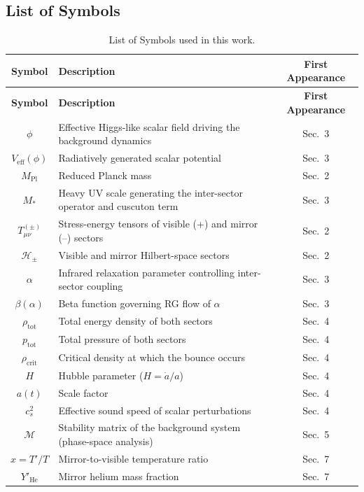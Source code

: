 \documentclass[11pt,a4paper]{article}
\begin{document}
\subsection*{List of Symbols}

\begin{longtable}{|c|p{9cm}|c|}
\caption{List of Symbols used in this work.} \label{tab:symbols} \\
\hline
\textbf{Symbol} & \textbf{Description} & \textbf{First Appearance} \\
\hline
\endfirsthead

\hline
\textbf{Symbol} & \textbf{Description} & \textbf{First Appearance} \\
\hline
\endhead

$\phi$ & Effective Higgs-like scalar field driving the background dynamics & Sec.~3 \\
$V_{\mathrm{eff}}(\phi)$ & Radiatively generated scalar potential & Sec.~3 \\
$M_{\mathrm{Pl}}$ & Reduced Planck mass & Sec.~2 \\
$M_{\ast}$ & Heavy UV scale generating the inter-sector operator and cuscuton term & Sec.~3 \\
$T^{(\pm)}_{\mu\nu}$ & Stress-energy tensors of visible (+) and mirror (–) sectors & Sec.~2 \\
$\mathcal{H}_{\pm}$ & Visible and mirror Hilbert-space sectors & Sec.~2 \\
$\alpha$ & Infrared relaxation parameter controlling inter-sector coupling & Sec.~3 \\
$\beta(\alpha)$ & Beta function governing RG flow of $\alpha$ & Sec.~3 \\
$\rho_{\mathrm{tot}}$ & Total energy density of both sectors & Sec.~4 \\
$p_{\mathrm{tot}}$ & Total pressure of both sectors & Sec.~4 \\
$\rho_{\mathrm{crit}}$ & Critical density at which the bounce occurs & Sec.~4 \\
$H$ & Hubble parameter ($H=\dot{a}/a$) & Sec.~4 \\
$a(t)$ & Scale factor & Sec.~4 \\
$c_{s}^{2}$ & Effective sound speed of scalar perturbations & Sec.~4 \\
$\mathcal{M}$ & Stability matrix of the background system (phase-space analysis) & Sec.~5 \\
$x=T'/T$ & Mirror-to-visible temperature ratio & Sec.~7 \\
$Y'_{\mathrm{He}}$ & Mirror helium mass fraction & Sec.~7 \\

\end{longtable}
\end{document}
